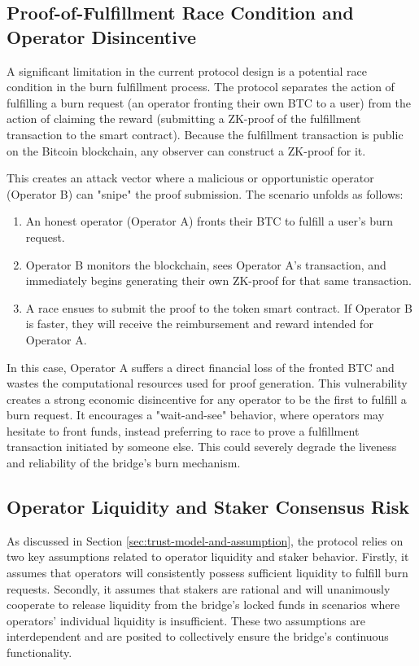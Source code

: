 \documentclass{DESSThesis}
\begin{document}
\subsection{Proof-of-Fulfillment Race Condition and Operator Disincentive}

A significant limitation in the current protocol design is a potential race condition in the burn fulfillment process. The protocol separates the action of fulfilling a burn request (an operator fronting their own BTC to a user) from the action of claiming the reward (submitting a ZK-proof of the fulfillment transaction to the smart contract). Because the fulfillment transaction is public on the Bitcoin blockchain, any observer can construct a ZK-proof for it.

This creates an attack vector where a malicious or opportunistic operator (Operator B) can "snipe" the proof submission. The scenario unfolds as follows:
\begin{enumerate}
    \item An honest operator (Operator A) fronts their BTC to fulfill a user's burn request.
    \item Operator B monitors the blockchain, sees Operator A's transaction, and immediately begins generating their own ZK-proof for that same transaction.
    \item A race ensues to submit the proof to the token smart contract. If Operator B is faster, they will receive the reimbursement and reward intended for Operator A.
\end{enumerate}

In this case, Operator A suffers a direct financial loss of the fronted BTC and wastes the computational resources used for proof generation. This vulnerability creates a strong economic disincentive for any operator to be the first to fulfill a burn request. It encourages a "wait-and-see" behavior, where operators may hesitate to front funds, instead preferring to race to prove a fulfillment transaction initiated by someone else. This could severely degrade the liveness and reliability of the bridge's burn mechanism.

\subsection{Operator Liquidity and Staker Consensus Risk} \label{subsec:liquidity_limitation}
As discussed in Section \ref{sec:trust-model-and-assumption}, the protocol relies on two key assumptions related to operator liquidity and staker behavior. Firstly, it assumes that operators will consistently possess sufficient liquidity to fulfill burn requests. Secondly, it assumes that stakers are rational and will unanimously cooperate to release liquidity from the bridge's locked funds in scenarios where operators' individual liquidity is insufficient. These two assumptions are interdependent and are posited to collectively ensure the bridge's continuous functionality.
\end{document}
